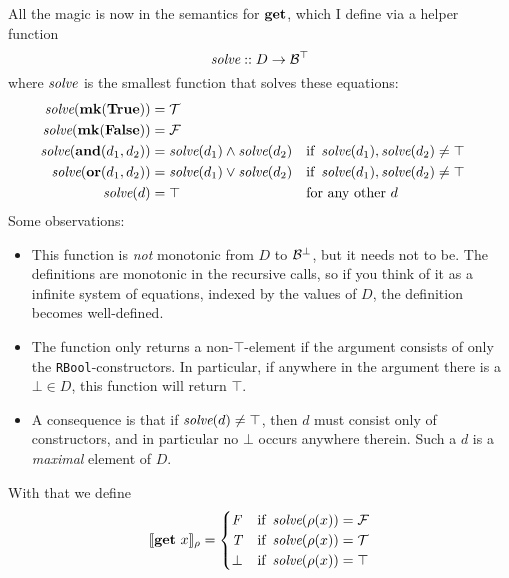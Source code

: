 \documentclass[manuscript,screen,acmsmall,nonacm]{acmart}
\begin{document}
All the magic is now in the semantics for $\mathbf{get}$, which I define via a helper function
\[
\operatorname{\textit{solve}} :: D \to \mathcal B^\top
\]
where $\operatorname{\textit{solve}}$ is the smallest function that solves these equations:
\begin{align*}
\operatorname{\textit{solve}}(\mathbf{mk}(\mathbf{True})) &= \mathcal T \\
\operatorname{\textit{solve}}(\mathbf{mk}(\mathbf{False})) &= \mathcal F \\
\operatorname{\textit{solve}}(\mathbf{and}(d_1,d_2)) &= \operatorname{\textit{solve}}(d_1) \wedge \operatorname{\textit{solve}}(d_2) &&\text{if } \operatorname{\textit{solve}}(d_1),\operatorname{\textit{solve}}(d_2) \ne \top \\
\operatorname{\textit{solve}}(\mathbf{or}(d_1,d_2)) &= \operatorname{\textit{solve}}(d_1) \vee \operatorname{\textit{solve}}(d_2) &&\text{if } \operatorname{\textit{solve}}(d_1),\operatorname{\textit{solve}}(d_2) \ne \top \\
\operatorname{\textit{solve}}(d) &= \top &&\text{for any other $d$}\\
\end{align*}
Some observations:
\begin{itemize}
\item This function is \emph{not} monotonic from $D$ to $\mathcal B^\bot$, but it needs not to be. The definitions are monotonic in the recursive calls, so if you think of it as a infinite system of equations, indexed by the values of $D$, the definition becomes well-defined.
\item The function only returns a non-$\top$-element if the argument consists of only the \texttt{RBool}-constructors. In particular, if anywhere in the argument there is a $\bot \in D$, this function will return $\top$.
\item A consequence is that if $\operatorname{\textit{solve}}(d) \ne \top$, then $d$ must consist only of constructors, and in particular no $\bot$ occurs anywhere therein. Such a $d$ is a \emph{maximal} element of $D$.
\end{itemize}

With that we define
\[
\llbracket \mathbf{get}~x \rrbracket_\rho =
\begin{cases}
\mathit F &\text{if } \operatorname{\textit{solve}}(\rho(x)) = \mathcal F \\
\mathit T &\text{if } \operatorname{\textit{solve}}(\rho(x)) = \mathcal T \\
\bot  &\text{if } \operatorname{\textit{solve}}(\rho(x)) = \top
\end{cases}
\]
\end{document}
